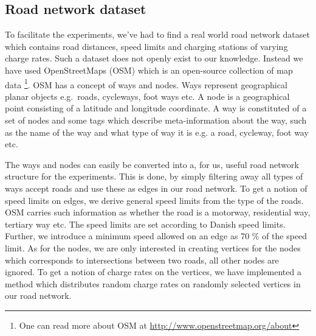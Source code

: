 \subsection{Road network dataset} 
\label{sub:setup}
To facilitate the experiments, we've had to find a real world road network dataset which contains road distances, speed limits and charging stations of varying charge rates. Such a dataset does not openly exist to our knowledge. Instead we have used OpenStreetMaps (OSM) which is an open-source collection of map data \footnote{One can read more about OSM at \url{http://www.openstreetmap.org/about}}. OSM has a concept of ways and nodes. Ways represent geographical planar objects e.g.\ roads, cycleways, foot ways etc. A node is a geographical point consisting of a latitude and longitude coordinate. A way is constituted of a set of nodes and some tags which describe meta-information about the way, such as the name of the way and what type of way it is e.g. a road, cycleway, foot way  etc. 

The ways and nodes can easily be converted into a, for us, useful road network structure for the experiments. This is done, by simply filtering away all types of ways accept roads and use these as edges in our road network. To get a notion of speed limits on edges, we derive general speed limits from the type of the roads. OSM carries such information as whether the road is a motorway, residential way, tertiary way etc. The speed limits are set according to Danish speed limits. Further, we introduce a minimum speed allowed on an edge as 70 \% of the speed limit. As for the nodes, we are only interested in creating vertices for the nodes which corresponds to intersections between two roads, all other nodes are ignored. To get a notion of charge rates on the vertices, we have implemented a method which distributes random charge rates on randomly selected vertices in our road network.
